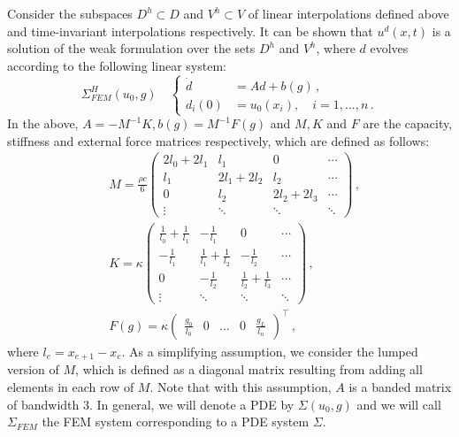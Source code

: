 \documentclass[letterpaper, 10 pt, conference]{ieeeconf/ieeeconf}
\begin{document}
Consider the subspaces $D^h \subset D$ and $V^h \subset V$ of linear
interpolations defined above and time-invariant interpolations respectively.
It can be shown that $u^d(x, t)$ is a solution of the weak formulation over the
sets $D^h$ and $V^h$, where $d$ evolves
according to the following linear system:
%
\begin{equation}\label{eq:fem}
    \Sigma^H_{FEM}(u_0, g) \quad \left \{
    \begin{aligned}
        \dot{d} &= A d + b(g) \,, \\
        d_i(0) &= u_0(x_i), \quad i = 1,...,n \,.
    \end{aligned}
    \right.
\end{equation}
%
In the above, $A = -M^{-1}K, b(g) = M^{-1} F(g)$ and $M, K$ and $F$ are the capacity,
stiffness and external force matrices respectively, which are defined as
follows:
%
    \begin{align}
        &M = \frac{\rho c}{6} \begin{pmatrix}
            2 l_0 + 2 l_1 & l_1  & 0 & \cdots \\ 
            l_1 & 2 l_1 + 2 l_2 & l_2  & \cdots \\ 
            0 & l_2 & 2 l_2 + 2 l_3 &  \cdots \\ 
            \vdots & \ddots & \ddots & \ddots 
        \end{pmatrix} \,, \label{eq:matrices_M} \\
        &K = \kappa \begin{pmatrix}
            \frac{1}{l_0} + \frac{1}{l_1} & -\frac{1}{l_1}  & 0 & \cdots \\ 
            -\frac{1}{l_1} & \frac{1}{l_1} + \frac{1}{l_2} & -\frac{1}{l_2}  & \cdots \\ 
            0 & -\frac{1}{l_2} & \frac{1}{l_2} + \frac{1}{l_3} &  \cdots \\ 
            \vdots & \ddots & \ddots & \ddots 
        \end{pmatrix} \,, \label{eq:matrices_K}\\
        &F(g) = \kappa \begin{pmatrix}
            \frac{g_0}{l_0} & 0 & \hdots & 0 & \frac{g_L}{l_n}
        \end{pmatrix}^\top \,, \label{eq:matrices_F}
    \end{align}
%
where $l_e = x_{e+1} - x_e$. As a simplifying assumption, we consider the lumped
version of $M$, which is defined as a diagonal matrix resulting from adding all
elements in each row of $M$. Note that with this assumption, $A$ is a banded
matrix of bandwidth 3. In general, we will denote a PDE by $\Sigma(u_0, g)$
and we will call $\Sigma_{FEM}$ the FEM system corresponding to a PDE system
$\Sigma$.
\end{document}
